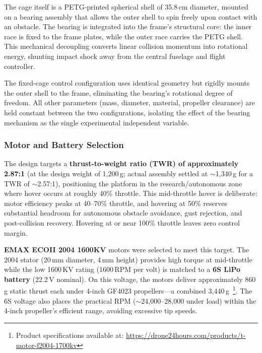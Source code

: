 The cage itself is a PETG-printed spherical shell of 35.8\,cm diameter, mounted on a bearing assembly that allows the outer shell to spin freely upon contact with an obstacle. The bearing is integrated into the frame's structural core: the inner race is fixed to the frame plates, while the outer race carries the PETG shell. This mechanical decoupling converts linear collision momentum into rotational energy, shunting impact shock away from the central fuselage and flight controller.


The fixed-cage control configuration uses identical geometry but rigidly mounts the outer shell to the frame, eliminating the bearing's rotational degree of freedom. All other parameters (mass, diameter, material, propeller clearance) are held constant between the two configurations, isolating the effect of the bearing mechanism as the single experimental independent variable.

\subsubsection{Motor and Battery Selection}

The design targets a \textbf{thrust-to-weight ratio (TWR) of approximately 2.87:1} (at the design weight of 1,200\,g; actual assembly settled at $\sim$1,340\,g for a TWR of $\sim$2.57:1), positioning the platform in the research/autonomous zone where hover occurs at roughly 40\% throttle. This mid-throttle hover is deliberate: motor efficiency peaks at 40--70\% throttle, and hovering at 50\% reserves substantial headroom for autonomous obstacle avoidance, gust rejection, and post-collision recovery. Hovering at or near 100\% throttle leaves zero control margin.\cite{bershadsky2016propulsion}

\textbf{EMAX ECOII 2004 1600KV} motors were selected to meet this target. The 2004 stator (20\,mm diameter, 4\,mm height) provides high torque at mid-throttle while the low 1600\,KV rating (1600\,RPM per volt) is matched to a \textbf{6S LiPo battery} (22.2\,V nominal). On this voltage, the motors deliver approximately 860\,g static thrust each under 4-inch GF4023 propellers---a combined 3,440\,g~\cite{bershadsky2016propulsion}\footnote{Product specifications available at: \url{https://drone24hours.com/products/t-motor-f2004-1700kv}}. The 6S voltage also places the practical RPM ($\sim$24,000--28,000 under load) within the 4-inch propeller's efficient range, avoiding excessive tip speeds.

